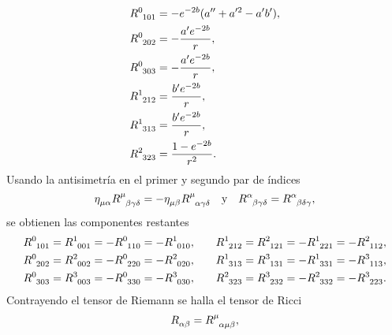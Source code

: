 \begin{align}
    \begin{split}
        \tensor{R}{^0_1_0_1} &= -e^{-2b}(a^{\prime\prime}+a^{\prime 2}-a^\prime b^\prime), \\
        \tensor{R}{^0_2_0_2} &= -\frac{a^\prime e^{-2b}}{r}, \\ 
        \tensor{R}{^0_3_0_3} &= -\frac{a^\prime e^{-2b}}{r}, \\
        \tensor{R}{^1_2_1_2} &= \frac{b^\prime e^{-2b}}{r}, \\
        \tensor{R}{^1_3_1_3} &= \frac{b^\prime e^{-2b}}{r}, \\
        \tensor{R}{^2_3_2_3} &= \frac{1-e^{-2b}}{r^2}.
    \end{split}
\end{align}
Usando la antisimetría en el primer y segundo par de índices
\begin{equation}
    \tensor{\eta}{_\mu_\alpha}\tensor{R}{^\mu_\beta_\gamma_\delta}=-\tensor{\eta}{_\mu_\beta}\tensor{R}{^\mu_\alpha_\gamma_\delta}\quad \text{y} \quad \tensor{R}{^\alpha_\beta_\gamma_\delta}=\tensor{R}{^\alpha_\beta_\delta_\gamma},
\end{equation}
se obtienen las componentes restantes
\begin{equation}
    \begin{split}
    \tensor{R}{^0_1_0_1} &= \tensor{R}{^1_0_0_1} = -\tensor{R}{^0_1_1_0} = -\tensor{R}{^1_0_1_0}, \\
    \tensor{R}{^0_2_0_2} &=  \tensor{R}{^2_0_0_2} = - \tensor{R}{^0_2_2_0} = - \tensor{R}{^2_0_2_0}, \\
    \tensor{R}{^0_3_0_3} &= \tensor{R}{^3_0_0_3} = -\tensor{R}{^0_3_3_0}=-\tensor{R}{^3_0_3_0},
    \end{split}
    \qquad
    \begin{split}
    \tensor{R}{^1_2_1_2} &= \tensor{R}{^2_1_2_1} = -\tensor{R}{^1_2_2_1}=-\tensor{R}{^2_1_1_2}, \\
    \tensor{R}{^1_3_1_3} &= \tensor{R}{^3_1_3_1} = -\tensor{R}{^1_3_3_1} = -\tensor{R}{^3_1_1_3}, \\
    \tensor{R}{^2_3_2_3} &= \tensor{R}{^3_2_3_2} = -\tensor{R}{^2_3_3_2} = -\tensor{R}{^3_2_2_3}.
    \end{split}
\end{equation}
Contrayendo el tensor de Riemann se halla el tensor de Ricci
\begin{equation}
    \tensor{R}{_\alpha_\beta}=\tensor{R}{^\mu_\alpha_\mu_\beta},
\end{equation}

